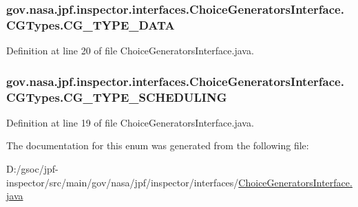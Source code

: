 \subsubsection[{\texorpdfstring{C\+G\+\_\+\+T\+Y\+P\+E\+\_\+\+D\+A\+TA}{CG_TYPE_DATA}}]{\setlength{\rightskip}{0pt plus 5cm}gov.\+nasa.\+jpf.\+inspector.\+interfaces.\+Choice\+Generators\+Interface.\+C\+G\+Types.\+C\+G\+\_\+\+T\+Y\+P\+E\+\_\+\+D\+A\+TA}\hypertarget{enumgov_1_1nasa_1_1jpf_1_1inspector_1_1interfaces_1_1_choice_generators_interface_1_1_c_g_types_a62ff2dda9e8bee4c9941b0660b4865c4}{}\label{enumgov_1_1nasa_1_1jpf_1_1inspector_1_1interfaces_1_1_choice_generators_interface_1_1_c_g_types_a62ff2dda9e8bee4c9941b0660b4865c4}


Definition at line 20 of file Choice\+Generators\+Interface.\+java.

\subsubsection[{\texorpdfstring{C\+G\+\_\+\+T\+Y\+P\+E\+\_\+\+S\+C\+H\+E\+D\+U\+L\+I\+NG}{CG_TYPE_SCHEDULING}}]{\setlength{\rightskip}{0pt plus 5cm}gov.\+nasa.\+jpf.\+inspector.\+interfaces.\+Choice\+Generators\+Interface.\+C\+G\+Types.\+C\+G\+\_\+\+T\+Y\+P\+E\+\_\+\+S\+C\+H\+E\+D\+U\+L\+I\+NG}\hypertarget{enumgov_1_1nasa_1_1jpf_1_1inspector_1_1interfaces_1_1_choice_generators_interface_1_1_c_g_types_a766b066ef3d860ada857acf368c3c860}{}\label{enumgov_1_1nasa_1_1jpf_1_1inspector_1_1interfaces_1_1_choice_generators_interface_1_1_c_g_types_a766b066ef3d860ada857acf368c3c860}


Definition at line 19 of file Choice\+Generators\+Interface.\+java.



The documentation for this enum was generated from the following file\+:\begin{DoxyCompactItemize}
\item 
D\+:/gsoc/jpf-\/inspector/src/main/gov/nasa/jpf/inspector/interfaces/\hyperlink{_choice_generators_interface_8java}{Choice\+Generators\+Interface.\+java}\end{DoxyCompactItemize}
